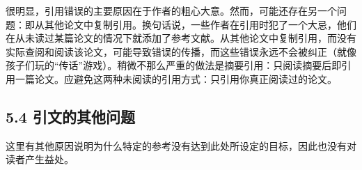 很明显，引用错误的主要原因在于作者的粗心大意。然而，可能还存在另一个问题：即从其他论文中复制引用。换句话说，一些作者在引用时犯了一个大忌，他们在从未读过某篇论文的情况下就添加了参考文献。从其他论文中复制引用，而没有实际查阅和阅读该论文，可能导致错误的传播，而这些错误永远不会被纠正（就像孩子们玩的“传话”游戏）。稍微不那么严重的做法是摘要引用：只阅读摘要后即引用一篇论文。应避免这两种未阅读的引用方式：只引用你真正阅读过的论文。

\subsection*{5.4 引文的其他问题}
这里有其他原因说明为什么特定的参考没有达到此处所设定的目标，因此也没有对读者产生益处。

